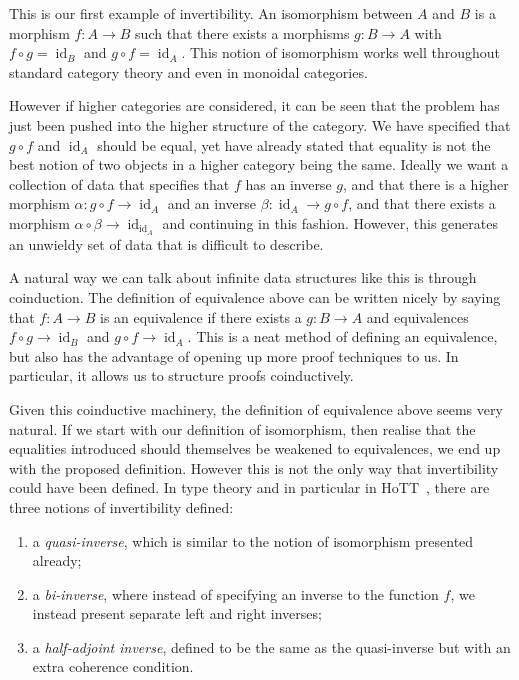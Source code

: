 \documentclass{article}
\DeclareMathOperator{\id}{id}
\begin{document}
This is our first example of invertibility. An isomorphism between
\(A\) and \(B\) is a morphism \(f : A \to B\) such that there exists a
morphisms \(g : B \to A\) with \(f \circ g = \id_B\) and \(g \circ f =
\id_A\). This notion of isomorphism works well throughout standard
category theory and even in monoidal categories.

However if higher categories are considered, it can be seen that the
problem has just been pushed into the higher structure of the
category. We have specified that \(g \circ f\) and \(\id_A\) should be
equal, yet have already stated that equality is not the best notion of
two objects in a higher category being the same. Ideally we want a collection of data
that specifies that \(f\) has an inverse \(g\), and that there is a
higher morphism \(\alpha : g \circ f \to \id_A\) and an inverse
\(\beta : \id_A \to g \circ f\), and that there exists a morphism
\(\alpha \circ \beta \to \id_{\id_A}\) and continuing in this fashion.
However, this generates an unwieldy set of data that is difficult to
describe.

A natural way we can talk about infinite data structures like this is through
coinduction. The definition of equivalence above can be written nicely
by saying that \(f : A \to B\) is an equivalence if there exists a \(g
: B \to A\) and equivalences \(f \circ g \to \id_B\) and \(g \circ f
\to \id_A\). This is a neat method of defining an equivalence, but
also has the advantage of opening up more proof techniques to us. In
particular, it allows us to structure proofs coinductively.

Given this coinductive machinery, the definition of equivalence above
seems very natural. If we start with our definition of isomorphism,
then realise that the equalities introduced should themselves be
weakened to equivalences, we end up with the proposed definition.
However this is not the only way that invertibility could have been
defined. In type theory and in particular in HoTT~\cite{hottbook},
there are three notions of invertibility defined:

\begin{enumerate}
\item a \emph{quasi-inverse}, which is similar to the notion of
  isomorphism presented already;
\item a \emph{bi-inverse}, where instead of specifying an inverse to
  the function \(f\), we instead present separate left and right
  inverses;
\item a \emph{half-adjoint inverse}, defined to be the same as the
  quasi-inverse but with an extra coherence condition.
\end{enumerate}
\end{document}
